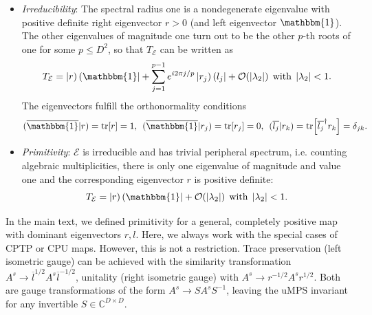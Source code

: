 \begin{itemize}
	\item \textit{Irreducibility}: The spectral radius one is a nondegenerate eigenvalue with positive definite right eigenvector $r > 0$ (and left eigenvector $\mathbbm{1}$). The other eigenvalues of magnitude one turn out to be the other $p$-th roots of one for some $p \leq D^2$, so that $T_{\mathcal{E}}$ can be written as
	\begin{equation}
	T_{\mathcal{E}} = \tket{r}\tbra{\mathbbm{1}} + \sum\limits_{j=1}^{p-1}e^{i2\pi j/p} \tket{r_j}\tbra{l_j} + \mathcal{O}(\vert \lambda_2 \vert) \:\:\mathrm{with}\:\: \vert \lambda_2 \vert < 1.
	\end{equation}
	The eigenvectors fulfill the orthonormality conditions 
	\begin{equation}
	( \overline{\mathbbm{1}} \vert r ) = \tr [r] = 1, \:\: ( \overline{\mathbbm{1}} \vert r_j ) = \tr [r_j] = 0, \:\: ( \overline{l_j} \vert r_k ) = \tr [\overline{l_j}^{\dagger} r_k] = \delta_{jk}.
	\end{equation}
	
	\item \textit{Primitivity}: $\mathcal{E}$ is irreducible and has trivial peripheral spectrum, i.e. counting algebraic multiplicities, there is only one eigenvalue of magnitude and value one and the corresponding eigenvector $r$ is positive definite:
	\begin{equation}
		T_{\mathcal{E}} = \tket{r}\tbra{\mathbbm{1}} + \mathcal{O}(\vert \lambda_2 \vert) \:\:\mathrm{with}\:\: \vert \lambda_2 \vert < 1.
	\end{equation}
\end{itemize}

\noindent In the main text, we defined primitivity for a general, completely positive map with dominant eigenvectors $r, l$. Here, we always work with the special cases of CPTP or CPU maps. However, this is not a restriction. Trace preservation (left isometric gauge) can be achieved with the similarity transformation $A^s \rightarrow \overline{l}^{1/2} A^s \overline{l}^{-1/2}$, unitality (right isometric gauge) with $A^s \rightarrow r^{-1/2} A^s r^{1/2}$. Both are gauge transformations of the form $A^s \rightarrow S A^s S^{-1}$, leaving the uMPS invariant for any invertible $S \in \mathbb{C}^{D \times D}$. \\

